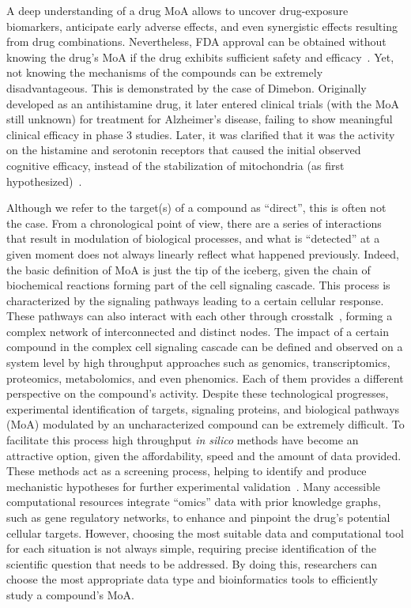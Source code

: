 A deep understanding of a drug \gls{MoA} allows to uncover drug-exposure biomarkers, anticipate early adverse effects, and even synergistic effects resulting from drug combinations. 
Nevertheless, FDA approval can be obtained without knowing the drug's \gls{MoA} if the drug exhibits sufficient safety and efficacy~\cite{RN38, RN68}. 
Yet, not knowing the mechanisms of the compounds can be extremely disadvantageous. This is demonstrated by the case of Dimebon. 
Originally developed as an antihistamine drug, it later entered clinical trials (with the \gls{MoA} still unknown) for treatment for Alzheimer's disease, failing to show meaningful clinical efficacy in phase 3 studies. 
Later, it was clarified that it was the activity on the histamine and serotonin receptors that caused the initial observed cognitive efficacy, instead of the stabilization of mitochondria (as first hypothesized)~\cite{RN38, RN69}.

Although we refer to the target(s) of a compound as “direct”, this is often not the case. 
From a chronological point of view, there are a series of interactions that result in modulation of biological processes, and what is “detected” at a given moment does not always linearly reflect what happened previously. 
Indeed, the basic definition of MoA is just the tip of the iceberg, given the chain of biochemical reactions forming part of the cell signaling cascade. 
This process is characterized by the signaling pathways leading to a certain cellular response. These pathways can also interact with each other through crosstalk~\cite{RN94}, forming a complex network of interconnected and distinct nodes. 
The impact of a certain compound in the complex cell signaling cascade can be defined and observed on a system level by high throughput approaches such as genomics, transcriptomics, proteomics, metabolomics, and even phenomics. 
Each of them provides a different perspective on the compound's activity. 
Despite these technological progresses, experimental identification of targets, signaling proteins, and biological pathways (\gls{MoA}) modulated by an uncharacterized compound can be extremely difficult. 
To facilitate this process high throughput \textit{in silico} methods have become an attractive option, given the affordability, speed and the amount of data provided. 
These methods act as a screening process, helping to identify and produce mechanistic hypotheses for further experimental validation~\cite{RN38}. 
Many accessible computational resources integrate “omics” data with prior knowledge graphs, such as gene regulatory networks, to enhance and pinpoint the drug's potential cellular targets. 
However, choosing the most suitable data and computational tool for each situation is not always simple, requiring precise identification of the scientific question that needs to be addressed. 
By doing this, researchers can choose the most appropriate data type and bioinformatics tools to efficiently study a compound's MoA.

